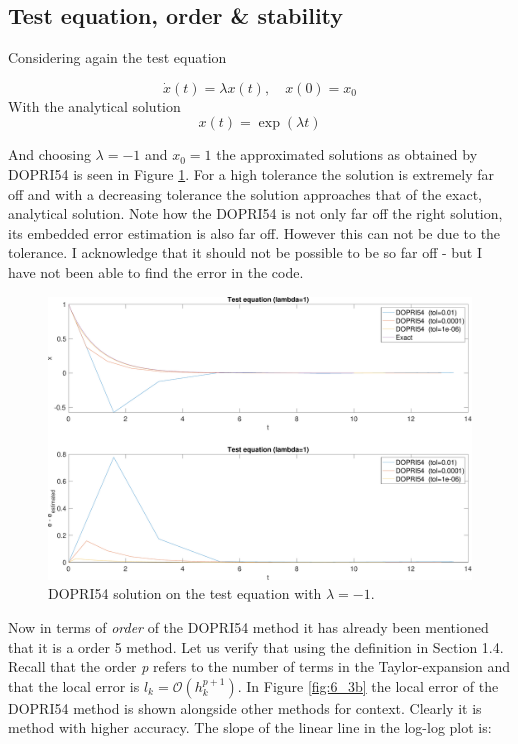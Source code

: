 \subsection{Test equation, order \& stability}
Considering again the test equation

$$
\dot{x}(t)=\lambda x(t), \quad x(0)=x_{0} \label{eq:test}
$$
With the analytical solution
$$
x(t) = \exp(\lambda t)
$$

And choosing $\lambda=-1$ and $x_{0}=1$ the approximated solutions as obtained by DOPRI54 is seen in Figure \ref{fig:6_3}. For a high tolerance the solution is extremely far off and with a decreasing tolerance the solution approaches that of the exact, analytical solution. Note how the DOPRI54 is not only far off the right solution, its embedded error estimation is also far off. However this can not be due to the tolerance. I acknowledge that it should not be possible to be so far off - but I have not been able to find the error in the code.\\

\begin{figure}[h]
    \centering
    \includegraphics[width=\textwidth]{plots/6_3a.pdf}
    \caption{DOPRI54 solution on the test equation with $\lambda=-1$.}
    \label{fig:6_3}
\end{figure}

Now in terms of \textit{order} of the DOPRI54 method it has already been mentioned that it is a order 5 method. Let us verify that using the definition in Section 1.4. Recall that the order \textit{p} refers to the number of terms in the Taylor-expansion and that the local error is $l_{k}=\mathcal{O}\left(h_{k}^{p+1}\right)$. In Figure \ref{fig:6_3b} the local error of the DOPRI54 method is shown alongside other methods for context. Clearly it is method with higher accuracy. The slope of the linear line in the log-log plot is:

